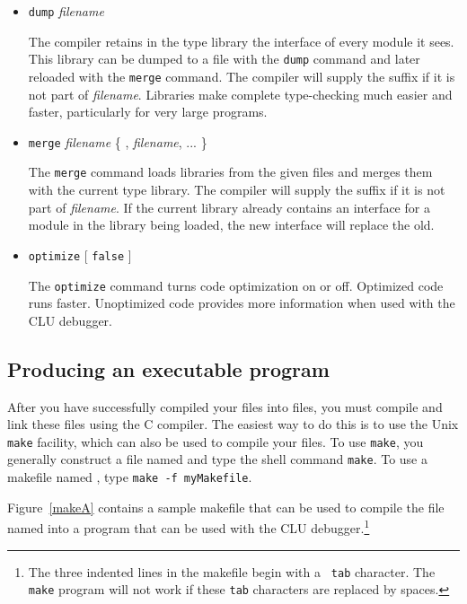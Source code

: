 \begin{itemize}
\item {\tt dump} {\it filename}

The compiler retains in the type library the interface of every module it sees.
This library can be dumped to a  file with the {\tt dump} command
and later reloaded with the {\tt merge} command.  The compiler will supply the
suffix  if it is not part of {\it filename}.  Libraries make
complete type-checking much easier and faster, particularly for very large
programs.

\item {\tt merge} {\it filename} \{ , {\it filename}, ... \}
\nopagebreak[4]

The {\tt merge} command loads libraries from the given  files and
merges them with the current type library.  The compiler will supply the suffix
 if it is not part of {\it filename}.  If the current library
already contains an interface for a module in the library being loaded, the new
interface will replace the old.


\item {\tt optimize} [ {\tt false} ]

The {\tt optimize} command turns code optimization on or off.  Optimized code
runs faster.  Unoptimized code provides more information when used with the CLU
debugger.
\end{itemize}


\subsection{Producing an executable program}

After you have successfully compiled your  files into 
files, you must compile and link these files using the C compiler.  The easiest
way to do this is to use the Unix {\tt make} facility, which can also be used
to compile your  files.  To use {\tt make}, you generally
construct a file named  and type the shell command {\tt make}.
To use a makefile named , type {\tt make -f myMakefile}.

Figure~\ref{makeA} contains a sample makefile that can be used to compile the
file named  into a program that can be used with the CLU
debugger.\footnote{The three indented lines in the makefile begin with a {\tt
tab} character.  The {\tt make} program will not work if these {\tt tab}
characters are replaced by spaces.}

